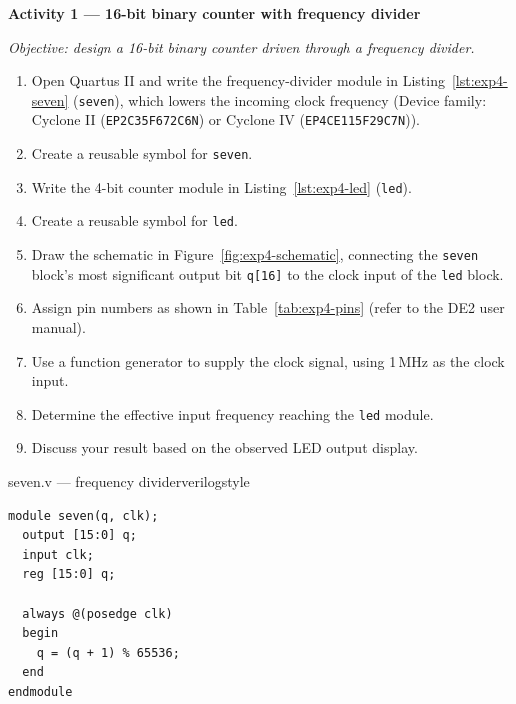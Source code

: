 \begin{procedure}

    \textbf{Activity 1 --- 16-bit binary counter with frequency divider}\vspace{2pt}

    \textit{Objective: design a 16-bit binary counter driven through a frequency divider.}

    \begin{enumerate}
        \item Open Quartus II and write the frequency-divider module in Listing~\ref{lst:exp4-seven} (\texttt{seven}), which lowers the incoming clock frequency (Device family: Cyclone II (\texttt{EP2C35F672C6N}) or Cyclone IV (\texttt{EP4CE115F29C7N})).
        \item Create a reusable symbol for \texttt{seven}.
        \item Write the 4-bit counter module in Listing~\ref{lst:exp4-led} (\texttt{led}).
        \item Create a reusable symbol for \texttt{led}.
        \item Draw the schematic in Figure~\ref{fig:exp4-schematic}, connecting the \texttt{seven} block's most significant output bit \texttt{q[16]} to the clock input of the \texttt{led} block.
        \item Assign pin numbers as shown in Table~\ref{tab:exp4-pins} (refer to the DE2 user manual).
        \item Use a function generator to supply the clock signal, using 1\,MHz as the clock input.
        \item Determine the effective input frequency reaching the \texttt{led} module.
        \item Discuss your result based on the observed LED output display.
    \end{enumerate}

    \begin{codepanel}{seven.v --- frequency divider}{verilogstyle}
        \begin{lstlisting}
module seven(q, clk);
  output [15:0] q;
  input clk;
  reg [15:0] q;

  always @(posedge clk)
  begin
    q = (q + 1) % 65536;
  end
endmodule
\end{lstlisting}
    \end{codepanel}
    \vspace{-4pt}


\end{procedure}
